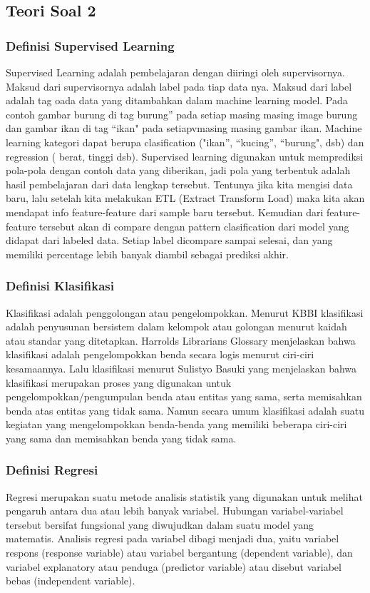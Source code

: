 \subsection{Teori Soal 2}
\subsubsection{Definisi Supervised Learning}
Supervised Learning adalah pembelajaran dengan diiringi oleh supervisornya. Maksud dari supervisornya adalah label pada tiap data nya. Maksud dari label adalah tag oada data yang ditambahkan dalam machine learning model. Pada contoh gambar burung di tag burung” pada setiap  masing masing image burung dan gambar ikan di tag “ikan" pada setiapvmasing masing gambar ikan. Machine learning kategori dapat berupa clasification ("ikan”, “kucing”, “burung", dsb) dan regression ( berat, tinggi dsb). Supervised learning digunakan untuk  memprediksi pola-pola dengan contoh data yang diberikan, jadi pola yang terbentuk adalah hasil pembelajaran dari data lengkap tersebut. Tentunya jika kita mengisi data baru, lalu setelah kita melakukan ETL (Extract Transform Load) maka kita akan mendapat info feature-feature dari sample baru tersebut. Kemudian dari feature-feature tersebut akan di compare dengan pattern clasification dari model yang didapat dari labeled data. Setiap label dicompare sampai selesai, dan yang memiliki percentage lebih banyak diambil sebagai prediksi akhir.
\subsubsection{Definisi Klasifikasi}
Klasifikasi adalah penggolongan atau pengelompokkan. Menurut KBBI klasifikasi adalah penyusunan bersistem dalam kelompok atau golongan menurut kaidah atau standar yang ditetapkan.  Harrolds Librarians Glossary menjelaskan bahwa klasifikasi adalah pengelompokkan benda secara logis menurut ciri-ciri kesamaannya. Lalu klasifikasi menurut Sulistyo Basuki yang menjelaskan bahwa klasifikasi merupakan proses yang digunakan untuk pengelompokkan/pengumpulan benda atau entitas yang sama, serta memisahkan benda atas entitas yang tidak sama. Namun  secara umum klasifikasi adalah suatu kegiatan yang mengelompokkan benda-benda yang memiliki beberapa ciri-ciri yang sama dan memisahkan benda yang tidak sama.
\subsubsection{Definisi Regresi}
Regresi merupakan suatu metode analisis statistik yang digunakan untuk melihat pengaruh antara dua atau lebih banyak variabel. Hubungan variabel-variabel tersebut bersifat fungsional yang diwujudkan dalam suatu model yang matematis. Analisis regresi pada variabel dibagi menjadi dua, yaitu variabel respons (response variable) atau variabel bergantung (dependent variable), dan variabel explanatory atau penduga (predictor variable) atau disebut variabel bebas (independent variable).
